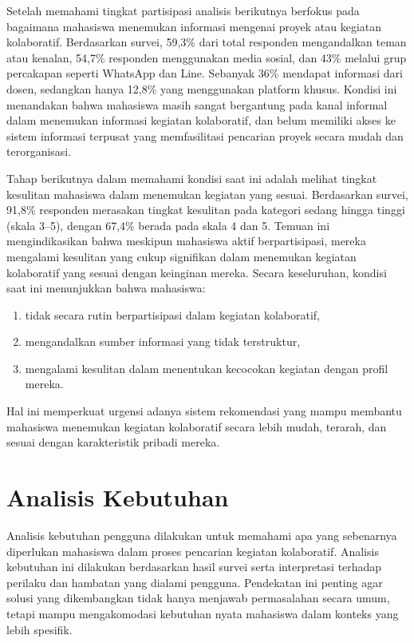 Setelah memahami tingkat partisipasi analisis berikutnya berfokus pada bagaimana mahasiswa menemukan informasi mengenai proyek atau kegiatan kolaboratif. Berdasarkan survei, 59,3\% dari total responden mengandalkan teman atau kenalan, 54,7\% responden menggunakan media sosial, dan 43\% melalui grup percakapan seperti WhatsApp dan Line. Sebanyak 36\% mendapat informasi dari dosen, sedangkan hanya 12,8\% yang menggunakan platform khusus. Kondisi ini menandakan bahwa mahasiswa masih sangat bergantung pada kanal informal dalam menemukan informasi kegiatan kolaboratif, dan belum memiliki akses ke sistem informasi terpusat yang memfasilitasi pencarian proyek secara mudah dan terorganisasi.

Tahap berikutnya dalam memahami kondisi saat ini adalah melihat tingkat kesulitan mahasiswa dalam menemukan kegiatan yang sesuai. Berdasarkan survei, 91,8\% responden merasakan tingkat kesulitan pada kategori sedang hingga tinggi (skala 3--5), dengan 67,4\% berada pada skala 4 dan 5. Temuan ini mengindikasikan bahwa meskipun mahasiswa aktif berpartisipasi, mereka mengalami kesulitan yang cukup signifikan dalam menemukan kegiatan kolaboratif yang sesuai dengan keinginan mereka. Secara keseluruhan, kondisi saat ini menunjukkan bahwa mahasiswa:

\begin{enumerate}
  \item tidak secara rutin berpartisipasi dalam kegiatan kolaboratif,
  \item mengandalkan sumber informasi yang tidak terstruktur,
  \item mengalami kesulitan dalam menentukan kecocokan kegiatan dengan profil mereka.
\end{enumerate}

Hal ini memperkuat urgensi adanya sistem rekomendasi yang mampu membantu mahasiswa menemukan kegiatan kolaboratif secara lebih mudah, terarah, dan sesuai dengan karakteristik pribadi mereka.

\section{Analisis Kebutuhan}

Analisis kebutuhan pengguna dilakukan untuk memahami apa yang sebenarnya diperlukan mahasiswa dalam proses pencarian kegiatan kolaboratif. Analisis kebutuhan ini dilakukan berdasarkan hasil survei serta interpretasi terhadap perilaku dan hambatan yang dialami pengguna. Pendekatan ini penting agar solusi yang dikembangkan tidak hanya menjawab permasalahan secara umum, tetapi mampu mengakomodasi kebutuhan nyata mahasiswa dalam konteks yang lebih spesifik.

